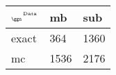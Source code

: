 \begin{tabular}{lll}
    \toprule
    $_{\text{\tiny{\ggn}}}$$^{\text{\tiny{Data}}}$ & mb & sub \\
    \midrule
    exact & 364
              & 1360 \\
    mc   & 1536
              & 2176 \\
    \bottomrule
\end{tabular}